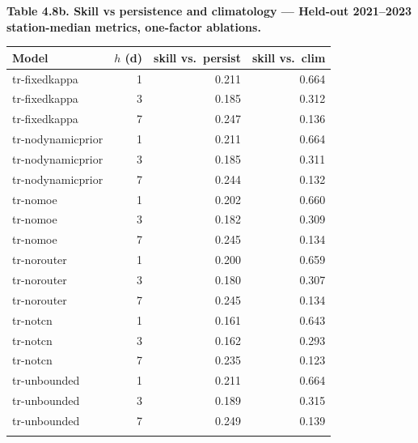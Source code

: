 \begin{table}[htbp]
\centering
\footnotesize
\setlength{\tabcolsep}{4pt}
\renewcommand{\arraystretch}{1.1}
\textbf{Table 4.8b. Skill vs persistence and climatology --- Held-out 2021--2023 station-median metrics, one-factor ablations.}
\par\medskip
\begin{tabular}{@{}lrrr@{}}
\toprule\noalign{}
Model & $h$ (d) & skill vs.\ persist & skill vs.\ clim \\
\midrule\noalign{}
tr-fixedkappa & 1 & 0.211 & 0.664 \\
tr-fixedkappa & 3 & 0.185 & 0.312 \\
tr-fixedkappa & 7 & 0.247 & 0.136 \\
tr-nodynamicprior & 1 & 0.211 & 0.664 \\
tr-nodynamicprior & 3 & 0.185 & 0.311 \\
tr-nodynamicprior & 7 & 0.244 & 0.132 \\
tr-nomoe & 1 & 0.202 & 0.660 \\
tr-nomoe & 3 & 0.182 & 0.309 \\
tr-nomoe & 7 & 0.245 & 0.134 \\
tr-norouter & 1 & 0.200 & 0.659 \\
tr-norouter & 3 & 0.180 & 0.307 \\
tr-norouter & 7 & 0.245 & 0.134 \\
tr-notcn & 1 & 0.161 & 0.643 \\
tr-notcn & 3 & 0.162 & 0.293 \\
tr-notcn & 7 & 0.235 & 0.123 \\
tr-unbounded & 1 & 0.211 & 0.664 \\
tr-unbounded & 3 & 0.189 & 0.315 \\
tr-unbounded & 7 & 0.249 & 0.139 \\
\bottomrule\noalign{}
\end{tabular}
\end{table}
